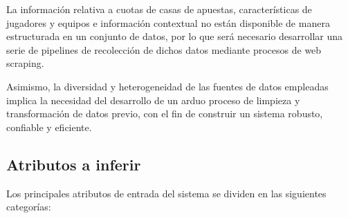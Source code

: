 La información relativa a cuotas de casas de apuestas, características de jugadores y equipos e información contextual no están disponible de manera estructurada en un conjunto de datos, por lo que será necesario desarrollar una serie de pipelines de recolección de dichos datos mediante procesos de web scraping. 

Asimismo, la diversidad y heterogeneidad de las fuentes de datos empleadas implica la necesidad del desarrollo de un arduo proceso de limpieza y transformación de datos previo, con el fin de construir un sistema robusto, confiable y eficiente. 

\subsection{Atributos a inferir}


Los principales atributos de entrada del sistema se dividen en las siguientes categorías:

